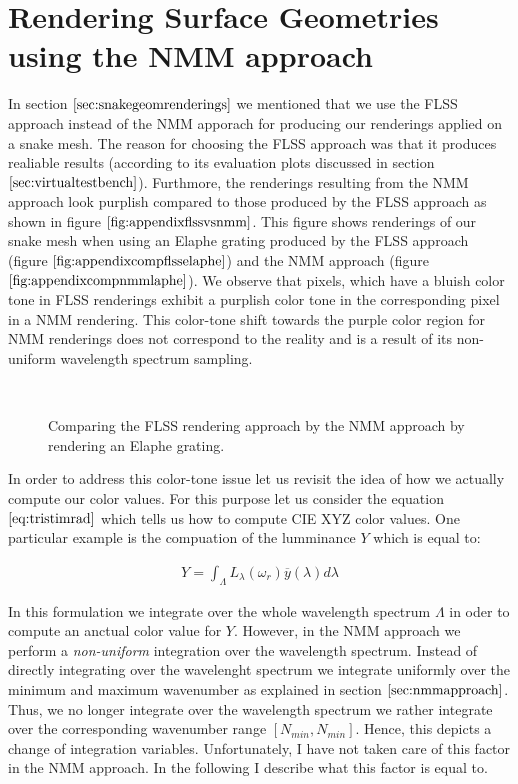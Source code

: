\chapter{Rendering Surface Geometries using the NMM approach}
\label{chap:diffflssnmm}

In section $\ref{sec:snakegeomrenderings}$ we mentioned that we use the FLSS approach instead of the NMM apporach for producing our renderings applied on a snake mesh. The reason for choosing the FLSS approach was that it produces realiable results (according to its evaluation plots discussed in section $\ref{sec:virtualtestbench}$). Furthmore, the renderings resulting from the NMM approach look purplish compared to those produced by the FLSS approach as shown in figure $\ref{fig:appendixflssvsnmm}$. This figure shows renderings of our snake mesh when using an Elaphe grating produced by the FLSS approach (figure $\ref{fig:appendixcompflsselaphe}$) and the NMM approach (figure $\ref{fig:appendixcompnmmlaphe}$). We observe that pixels, which have a bluish color tone in FLSS renderings exhibit a purplish color tone in the corresponding pixel in a NMM rendering. This color-tone shift towards the purple color region for NMM renderings does not correspond to the reality and is a result of its non-uniform wavelength spectrum sampling. 

\begin{figure}[H]
  \centering
~
~
\caption[Comparing NMM Approach with FLSS Approach]{Comparing the FLSS rendering approach by the NMM approach by rendering an Elaphe grating.}
\label{fig:appendixflssvsnmm}
\end{figure}

In order to address this color-tone issue let us revisit the idea of how we actually compute our color values. For this purpose let us consider the equation $\ref{eq:tristimrad}$ which tells us how to compute CIE XYZ color values. One particular example is the compuation of the lumminance $Y$ which is equal to:

\begin{align}
Y = \int_{\Lambda}L_\lambda(\omega_r)\overline{y}(\lambda)d\lambda \nonumber
\end{align}

In this formulation we integrate over the whole wavelength spectrum $\Lambda$ in oder to compute an anctual color value for $Y$. However, in the NMM approach we perform a \emph{non-uniform} integration over the wavelength spectrum. Instead of directly integrating over the wavelenght spectrum we integrate uniformly over the minimum and maximum wavenumber as explained in section $\ref{sec:nmmapproach}$. Thus, we no longer integrate over the wavelength spectrum we rather integrate over the corresponding wavenumber range $[N_{min}, N_{min}]$. Hence, this depicts a change of integration variables. Unfortunately, I have not taken care of this factor in the NMM approach. In the following I describe what this factor is equal to. \\

